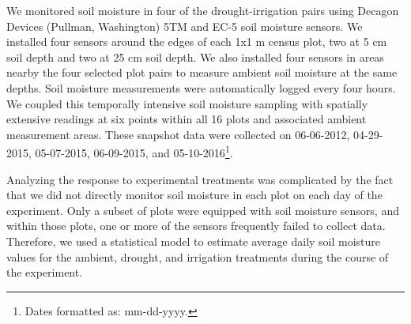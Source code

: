 \documentclass[fleqn,10pt,lineno]{wlpeerj} %
\begin{document}
We monitored soil moisture in four of the drought-irrigation pairs using
Decagon Devices (Pullman, Washington) 5TM and EC-5 soil moisture
sensors. We installed four sensors around the edges of each 1x1 m census
plot, two at 5 cm soil depth and two at 25 cm soil depth. We also
installed four sensors in areas nearby the four selected plot pairs to
measure ambient soil moisture at the same depths. Soil moisture
measurements were automatically logged every four hours. We coupled this
temporally intensive soil moisture sampling with spatially extensive
readings  at six points within
all 16 plots and associated ambient measurement areas. These snapshot
data were collected on 06-06-2012, 04-29-2015, 05-07-2015, 06-09-2015,
and 05-10-2016\footnote{Dates formatted as: mm-dd-yyyy.}.

Analyzing the response to experimental treatments was complicated by the
fact that we did not directly monitor soil moisture in each plot on each
day of the experiment. Only a subset of plots were equipped with soil
moisture sensors, and within those plots, one or more of the sensors
frequently failed to collect data. Therefore, we used a statistical
model to estimate average daily soil moisture values for the ambient,
drought, and irrigation treatments during the course of the experiment.

\end{document}
